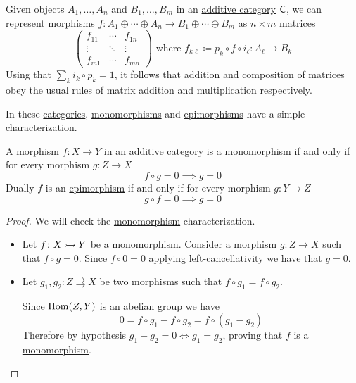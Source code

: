 \documentclass[../../main]{subfiles}
\begin{document}
\begin{remark}
  Given objects \(A_{1}, \ldots, A_{n}\) and \(B_{1}, \ldots, B_{m}\) in an \hyperref[def:additive-category]{additive category} \(\mathsf{C}\), we can represent morphisms \(f\colon A_{1} \oplus \cdots \oplus A_{n} \to B_{1} \oplus \cdots \oplus B_{m}\) as \(n \times m\) matrices
  \begin{equation*}
    \begin{pmatrix}
      f_{11} & \cdots & f_{1n} \\
      \vdots & \ddots & \vdots \\
      f_{m1} & \cdots & f_{mn}
    \end{pmatrix}
    \text{ where } f_{k\ell}\coloneq p_{k} \circ f \circ i_{\ell}\colon A_{\ell} \to B_{k}
  \end{equation*}
  Using that \(\sum_{k} i_{k} \circ p_{k} = 1\), it follows that addition and composition of matrices obey the usual rules of matrix addition and multiplication respectively.
\end{remark}

In these \hyperref[def:category]{categories}, \hyperref[def:mono-epi-morphism]{monomorphisms} and \hyperref[def:mono-epi-morphism]{epimorphisms} have a simple characterization.
\begin{lemma} \label{lemma:mono-epi-additive}
  A morphism \(f\colon X \to Y\) in an \hyperref[def:additive-category]{additive category} is a \hyperref[def:mono-epi-morphism]{monomorphism} if and only if for every morphism \(g\colon Z \to X\)
  \begin{equation*}
    f \circ g = 0 \implies g = 0
  \end{equation*}
  Dually \(f\) is an \hyperref[def:mono-epi-morphism]{epimorphism} if and only if for every morphism \(g\colon Y \to Z\)
  \begin{equation*}
    g \circ f = 0 \implies g = 0
  \end{equation*}
\end{lemma}
\begin{proof}
  We will check the \hyperref[def:mono-epi-morphism]{monomorphism} characterization.
  \begin{itemize}
    \item[\(\implies\)] Let \(f\colon X \rightarrowtail Y\) be a \hyperref[def:mono-epi-morphism]{monomorphism}.
          Consider a morphism \(g\colon Z \to X\) such that \(f \circ g = 0\).
          Since \(f \circ 0 = 0\) applying left-cancellativity we have that \(g = 0\).
    \item[\(\impliedby\)] Let \(g_{1}, g_{2}\colon Z \rightrightarrows X\) be two morphisms such that \(f \circ g_{1} = f \circ g_{2}\).

          Since \(\operatorname{Hom}(Z, Y)\) is an abelian group we have
          \begin{equation*}
            0 = f \circ g_{1} - f \circ g_{2} = f \circ (g_{1} - g_{2})
          \end{equation*}
          Therefore by hypothesis \(g_{1} - g_{2} = 0 \iff g_{1} = g_{2}\), proving that \(f\) is a \hyperref[def:mono-epi-morphism]{monomorphism}. \qedhere
  \end{itemize}
\end{proof}
\end{document}
